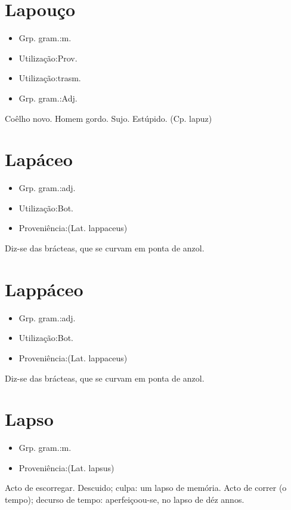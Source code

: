 \section{Lapouço}
\begin{itemize}
\item {Grp. gram.:m.}
\end{itemize}
\begin{itemize}
\item {Utilização:Prov.}
\end{itemize}
\begin{itemize}
\item {Utilização:trasm.}
\end{itemize}
\begin{itemize}
\item {Grp. gram.:Adj.}
\end{itemize}
Coêlho novo.
Homem gordo.
Sujo.
Estúpido.
(Cp. \textunderscore lapuz\textunderscore )
\section{Lapáceo}
\begin{itemize}
\item {Grp. gram.:adj.}
\end{itemize}
\begin{itemize}
\item {Utilização:Bot.}
\end{itemize}
\begin{itemize}
\item {Proveniência:(Lat. \textunderscore lappaceus\textunderscore )}
\end{itemize}
Diz-se das brácteas, que se curvam em ponta de anzol.
\section{Lappáceo}
\begin{itemize}
\item {Grp. gram.:adj.}
\end{itemize}
\begin{itemize}
\item {Utilização:Bot.}
\end{itemize}
\begin{itemize}
\item {Proveniência:(Lat. \textunderscore lappaceus\textunderscore )}
\end{itemize}
Diz-se das brácteas, que se curvam em ponta de anzol.
\section{Lapso}
\begin{itemize}
\item {Grp. gram.:m.}
\end{itemize}
\begin{itemize}
\item {Proveniência:(Lat. \textunderscore lapsus\textunderscore )}
\end{itemize}
Acto de escorregar.
Descuido; culpa: \textunderscore um lapso de memória\textunderscore .
Acto de correr (o tempo); decurso de tempo: \textunderscore aperfeiçoou-se, no lapso de déz annos\textunderscore .
